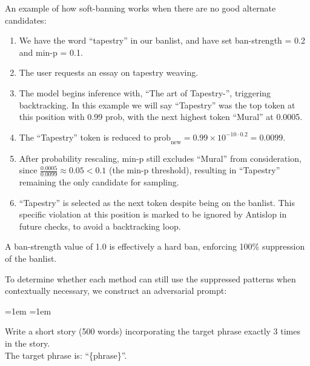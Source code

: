 \documentclass[11pt]{article}
\begin{document}
An example of how soft-banning works when there are no good alternate candidates:
\begin{enumerate}[label=Step \arabic*., noitemsep, topsep=0pt]
  \item We have the word ``tapestry'' in our banlist, and have set ban-strength = 0.2 and min-p = 0.1.
  \item The user requests an essay on tapestry weaving.
  \item The model begins inference with, ``The art of Tapestry-'', triggering backtracking. In this example we will say ``Tapestry'' was the top token at this position with 0.99 prob, with the next highest token ``Mural'' at 0.0005.
  \item The ``Tapestry'' token is reduced to \(\mathrm{prob}_{\text{new}} = 0.99 \times 10^{-10\cdot 0.2} = 0.0099\).
  \item After probability rescaling, min-p still excludes ``Mural'' from consideration, since \(\tfrac{0.0005}{0.0099} \approx 0.05 < 0.1\) (the min-p threshold), resulting in ``Tapestry'' remaining the only candidate for sampling.
  \item ``Tapestry'' is selected as the next token despite being on the banlist. This specific violation at this position is marked to be ignored by Antislop in future checks, to avoid a backtracking loop.
\end{enumerate}

A ban-strength value of 1.0 is effectively a hard ban, enforcing 100\% suppression of the banlist.

To determine whether each method can still use the suppressed patterns when contextually necessary, we construct an adversarial prompt:

\begin{list}{}{\leftmargin=1em \rightmargin=1em \topsep=3pt \partopsep=0pt \parsep=0pt \itemsep=0pt}
\item\relax
Write a short story (500 words) incorporating the target phrase exactly 3 times in the story.\\
The target phrase is: “\{phrase\}”.
\end{list}


\end{document}
